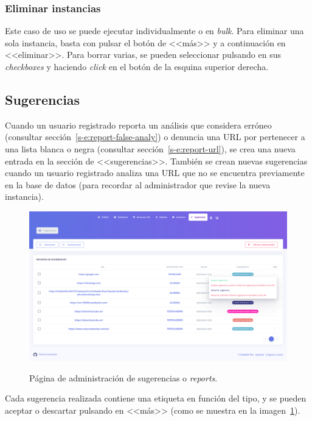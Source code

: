 \subsubsection{Eliminar instancias}

Este caso de uso se puede ejecutar individualmente o en \textit{bulk}. Para eliminar una sola instancia, basta con pulsar el botón de <<más>> y a continuación en <<eliminar>>. Para borrar varias, se pueden seleccionar pulsando en sus \textit{checkboxes} y haciendo \textit{click} en el botón de la esquina superior derecha.

\subsection{Sugerencias}
\label{s-e:sugerencias}

Cuando un usuario registrado reporta un análisis que considera erróneo (consultar sección~\ref{s-e:report-false-analy}) o denuncia una URL por pertenecer a una lista blanca o negra (consultar sección~\ref{s-e:report-url}), se crea una nueva entrada en la sección de <<sugerencias>>. También se crean nuevas sugerencias cuando un usuario registrado analiza una URL que no se encuentra previamente en la base de datos (para recordar al administrador que revise la nueva instancia).

\begin{figure}[h]
	\caption[Manual de usuario: administrar sugerencias]{Página de administración de sugerencias o \textit{reports}.}
	\centering
	\includegraphics[width=\textwidth]{../img/anexos/user_guide/7_reports}
	\label{e-7:reports}
\end{figure}

Cada sugerencia realizada contiene una etiqueta en función del tipo, y se pueden aceptar o descartar pulsando en <<más>> (como se muestra en la imagen~\ref{e-7:reports}).

